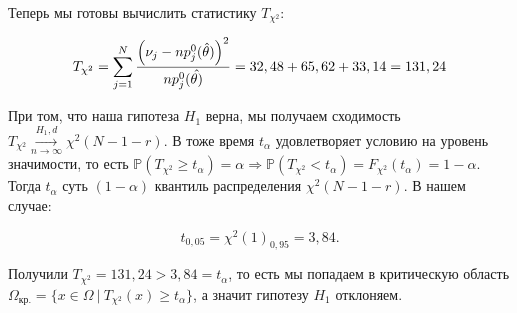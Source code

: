 \documentclass[14pt]{extarticle}
\begin{document}
Теперь мы готовы вычислить статистику $T_{\chi^2}$:

\begin{equation}
\notag
    T_{\chi^2} = \sum\limits_{j=1}^N\frac{\left(\nu_j - np_j^0(\hat{\theta})\right)^2}{np_j^0(\hat{\theta)}} = 32,48 + 65,62 + 33,14 = 131,24
\end{equation}


При том, что наша гипотеза $H_1$ верна, мы получаем сходимость $T_{\chi^2}\overset{H_1, d}{\underset{n\rightarrow\infty}{\longrightarrow}} \chi^2(N-1-r)$. В тоже время $t_{\alpha}$ удовлетворяет условию на уровень значимости, то есть $\mathbb P(T_{\chi^2} \geq t_{\alpha}) = \alpha\Rightarrow \mathbb P(T_{\chi^2} < t_\alpha) = F_{\chi^2} (t_{\alpha}) = 1 - \alpha$. Тогда $t_{\alpha}$ суть $(1-\alpha)$ квантиль распределения $\chi^2(N-1-r)$. В нашем случае:

\begin{equation*}
    t_{0,05} = \chi^2(1)_{0,95} = 3,84.
\end{equation*}

Получили $T_{\chi^2} = 131,24 > 3,84 = t_{\alpha}$, то есть мы попадаем в критическую область $\Omega_{\text{кр.}} = \{x\in\Omega ~|~ T_{\chi^2}(x) \geq t_{\alpha}\}$, а значит гипотезу $H_1$ отклоняем.
\end{document}
